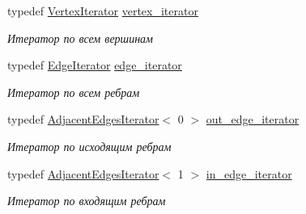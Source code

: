 \begin{DoxyCompactItemize}
typedef \hyperlink{class_s_p_u___g_r_a_p_h_1_1_spu_ultra_graph_1_1_vertex_iterator}{Vertex\+Iterator} \hyperlink{class_s_p_u___g_r_a_p_h_1_1_spu_ultra_graph_a06163cbc87b2e49334b4bcc46c7b0c89}{vertex\+\_\+iterator}
\begin{DoxyCompactList}\small\item\em Итератор по всем вершинам \end{DoxyCompactList}\item 
\mbox{\label{class_s_p_u___g_r_a_p_h_1_1_spu_ultra_graph_abf3933dd7a8c18410837fee58a8a8a10}} 
typedef \hyperlink{class_s_p_u___g_r_a_p_h_1_1_spu_ultra_graph_1_1_edge_iterator}{Edge\+Iterator} \hyperlink{class_s_p_u___g_r_a_p_h_1_1_spu_ultra_graph_abf3933dd7a8c18410837fee58a8a8a10}{edge\+\_\+iterator}
\begin{DoxyCompactList}\small\item\em Итератор по всем ребрам \end{DoxyCompactList}\item 
\mbox{\label{class_s_p_u___g_r_a_p_h_1_1_spu_ultra_graph_adccd2b84a437514b4c5d341ccfea6f8b}} 
typedef \hyperlink{class_s_p_u___g_r_a_p_h_1_1_spu_ultra_graph_1_1_adjacent_edges_iterator}{Adjacent\+Edges\+Iterator}$<$ 0 $>$ \hyperlink{class_s_p_u___g_r_a_p_h_1_1_spu_ultra_graph_adccd2b84a437514b4c5d341ccfea6f8b}{out\+\_\+edge\+\_\+iterator}
\begin{DoxyCompactList}\small\item\em Итератор по исходящим ребрам \end{DoxyCompactList}\item 
\mbox{\label{class_s_p_u___g_r_a_p_h_1_1_spu_ultra_graph_ae658ac8b09fc1b84711e434354e027cd}} 
typedef \hyperlink{class_s_p_u___g_r_a_p_h_1_1_spu_ultra_graph_1_1_adjacent_edges_iterator}{Adjacent\+Edges\+Iterator}$<$ 1 $>$ \hyperlink{class_s_p_u___g_r_a_p_h_1_1_spu_ultra_graph_ae658ac8b09fc1b84711e434354e027cd}{in\+\_\+edge\+\_\+iterator}
\begin{DoxyCompactList}\small\item\em Итератор по входящим ребрам \end{DoxyCompactList}\item 
\mbox{\label{class_s_p_u___g_r_a_p_h_1_1_spu_ultra_graph_ae0fda272e54e0400446887572a5b4587}} 

\end{DoxyCompactItemize}
